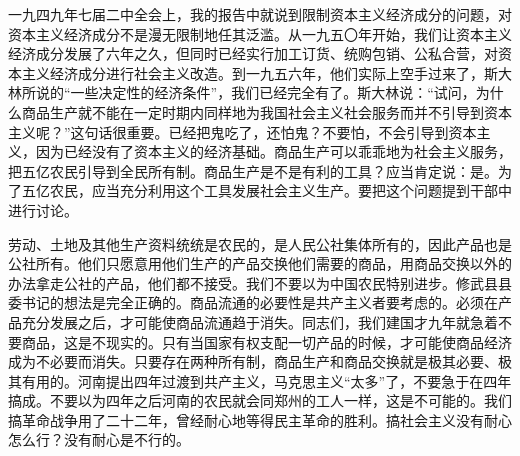 一九四九年七届二中全会上，我的报告中就说到限制资本主义经济成分的问题，对资本主义经济成分不是漫无限制地任其泛滥。从一九五〇年开始，我们让资本主义经济成分发展了六年之久，但同时已经实行加工订货、统购包销、公私合营，对资本主义经济成分进行社会主义改造。到一九五六年，他们实际上空手过来了，斯大林所说的“一些决定性的经济条件”，我们已经完全有了。斯大林说：“试问，为什么商品生产就不能在一定时期内同样地为我国社会主义社会服务而并不引导到资本主义呢？”这句话很重要。已经把鬼吃了，还怕鬼？不要怕，不会引导到资本主义，因为已经没有了资本主义的经济基础。商品生产可以乖乖地为社会主义服务，把五亿农民引导到全民所有制。商品生产是不是有利的工具？应当肯定说：是。为了五亿农民，应当充分利用这个工具发展社会主义生产。要把这个问题提到干部中进行讨论。

劳动、土地及其他生产资料统统是农民的，是人民公社集体所有的，因此产品也是公社所有。他们只愿意用他们生产的产品交换他们需要的商品，用商品交换以外的办法拿走公社的产品，他们都不接受。我们不要以为中国农民特别进步。修武县县委书记的想法是完全正确的。商品流通的必要性是共产主义者要考虑的。必须在产品充分发展之后，才可能使商品流通趋于消失。同志们，我们建国才九年就急着不要商品，这是不现实的。只有当国家有权支配一切产品的时候，才可能使商品经济成为不必要而消失。只要存在两种所有制，商品生产和商品交换就是极其必要、极其有用的。河南提出四年过渡到共产主义，马克思主义“太多”了，不要急于在四年搞成。不要以为四年之后河南的农民就会同郑州的工人一样，这是不可能的。我们搞革命战争用了二十二年，曾经耐心地等得民主革命的胜利。搞社会主义没有耐心怎么行？没有耐心是不行的。

